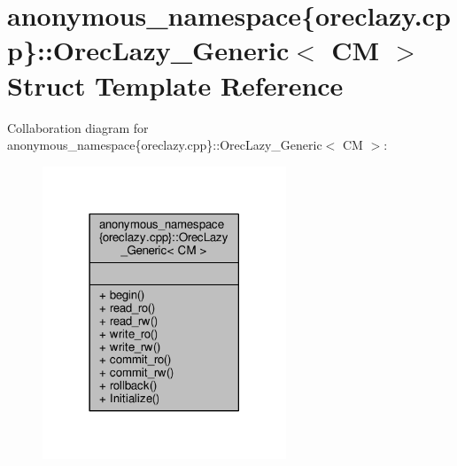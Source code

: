 \hypertarget{structanonymous__namespace_02oreclazy_8cpp_03_1_1OrecLazy__Generic}{\section{anonymous\-\_\-namespace\{oreclazy.\-cpp\}\-:\-:Orec\-Lazy\-\_\-\-Generic$<$ C\-M $>$ Struct Template Reference}
\label{structanonymous__namespace_02oreclazy_8cpp_03_1_1OrecLazy__Generic}
}


Collaboration diagram for anonymous\-\_\-namespace\{oreclazy.\-cpp\}\-:\-:Orec\-Lazy\-\_\-\-Generic$<$ C\-M $>$\-:
\nopagebreak
\begin{figure}[H]
\begin{center}
\leavevmode
\includegraphics[width=206pt]{structanonymous__namespace_02oreclazy_8cpp_03_1_1OrecLazy__Generic__coll__graph}
\end{center}
\end{figure}
